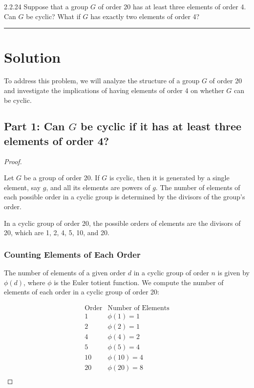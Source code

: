 \documentclass[12pt]{amsart}
\theoremstyle{definition}
\numberwithin{equation}{section}
\begin{document}
\begin{exercise}{2.2.24} 
    Suppose that a group \(G\) of order 20 has at least three elements of order 4. Can \(G\) be cyclic? What if \(G\) has exactly two elements of order 4?
    
    \noindent\rule{\linewidth}{1pt}
    
    \section*{Solution}
    
    To address this problem, we will analyze the structure of a group \(G\) of order 20 and investigate the implications of having elements of order 4 on whether \(G\) can be cyclic.
    
    \subsection*{Part 1: Can \(G\) be cyclic if it has at least three elements of order 4?}
    
    \begin{proof} \( \)
    
    Let \(G\) be a group of order 20. If \(G\) is cyclic, then it is generated by a single element, say \(g\), and all its elements are powers of \(g\). The number of elements of each possible order in a cyclic group is determined by the divisors of the group's order.
    
    In a cyclic group of order 20, the possible orders of elements are the divisors of 20, which are 1, 2, 4, 5, 10, and 20.
    
    \subsubsection*{Counting Elements of Each Order}
    The number of elements of a given order \(d\) in a cyclic group of order \(n\) is given by \(\phi(d)\), where \(\phi\) is the Euler totient function. We compute the number of elements of each order in a cyclic group of order 20:
    
    \[
    \begin{array}{c|c}
    \text{Order} & \text{Number of Elements} \\
    \hline
    1 & \phi(1) = 1 \\
    2 & \phi(2) = 1 \\
    4 & \phi(4) = 2 \\
    5 & \phi(5) = 4 \\
    10 & \phi(10) = 4 \\
    20 & \phi(20) = 8 \\
    \end{array}
    \]
    

\end{proof}
\end{exercise}
\end{document}
